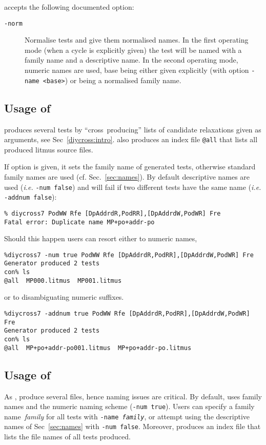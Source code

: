 \diyone{} accepts the following documented option:
\begin{description}
\item[{\tt -norm}] Normalise tests and give them normalised names.
In the first operating mode (when a cycle is explicitly given) the test
will be named with a family name and a descriptive name.
In the second operating mode,
numeric names are used, base being either given explicitly
(with option \texttt{-name <base>}) or being a normalised family name.
\end{description}


\subsection{Usage of \diycross}
\diycross{} produces several tests by ``cross~producing'' lists
of candidate relaxations given as arguments, see
Sec~\ref{diycross:intro}.
\diycross{} also produces an index file \texttt{@all} that lists all produced
litmus source files.

If option  is given, it sets the family name of
generated tests, otherwise standard family names are used
(cf. Sec.~\ref{sec:names}).
By default descriptive names are used (\emph{i.e.} \texttt{-num false})
and \diycross{} will fail if two different tests have the same name
(\emph{i.e.} \texttt{-addnum false}):
\begin{verbatim}
% diycross7 PodWW Rfe [DpAddrdR,PodRR],[DpAddrdW,PodWR] Fre
Fatal error: Duplicate name MP+po+addr-po
\end{verbatim}
Should this happen users can resort either to numeric names,
\begin{verbatim}
%diycross7 -num true PodWW Rfe [DpAddrdR,PodRR],[DpAddrdW,PodWR] Fre
Generator produced 2 tests
con% ls
@all  MP000.litmus  MP001.litmus
\end{verbatim}
or to disambiguating numeric suffixes.
\begin{verbatim}
%diycross7 -addnum true PodWW Rfe [DpAddrdR,PodRR],[DpAddrdW,PodWR] Fre
Generator produced 2 tests
con% ls
@all  MP+po+addr-po001.litmus  MP+po+addr-po.litmus
\end{verbatim}


\subsection{Usage\label{diy:usage} of {\diy}}
As \diycross, \diy{} produce several files, hence naming issues are critical.
By default, \diy{} uses family names and the numeric naming scheme
(\texttt{-num true}).
Users can specify a family name~\emph{family}
for all tests with \texttt{-name \emph{family}},
or attempt using the descriptive names of Sec~\ref{sec:names}
with \texttt{-num false}.
Moreover, \diy{} produces an index file  that lists
the file names of all tests produced.


